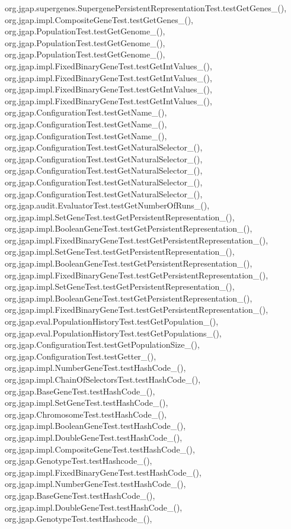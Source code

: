 org.\-jgap.\-supergenes.\-Supergene\-Persistent\-Representation\-Test.\-test\-Get\-Genes\-\_(), org.\-jgap.\-impl.\-Composite\-Gene\-Test.\-test\-Get\-Genes\-\_(), org.\-jgap.\-Population\-Test.\-test\-Get\-Genome\-\_(), org.\-jgap.\-Population\-Test.\-test\-Get\-Genome\-\_(), org.\-jgap.\-Population\-Test.\-test\-Get\-Genome\-\_(), org.\-jgap.\-impl.\-Fixed\-Binary\-Gene\-Test.\-test\-Get\-Int\-Values\-\_(), org.\-jgap.\-impl.\-Fixed\-Binary\-Gene\-Test.\-test\-Get\-Int\-Values\-\_(), org.\-jgap.\-impl.\-Fixed\-Binary\-Gene\-Test.\-test\-Get\-Int\-Values\-\_(), org.\-jgap.\-impl.\-Fixed\-Binary\-Gene\-Test.\-test\-Get\-Int\-Values\-\_(), org.\-jgap.\-Configuration\-Test.\-test\-Get\-Name\-\_(), org.\-jgap.\-Configuration\-Test.\-test\-Get\-Name\-\_(), org.\-jgap.\-Configuration\-Test.\-test\-Get\-Name\-\_(), org.\-jgap.\-Configuration\-Test.\-test\-Get\-Natural\-Selector\-\_(), org.\-jgap.\-Configuration\-Test.\-test\-Get\-Natural\-Selector\-\_(), org.\-jgap.\-Configuration\-Test.\-test\-Get\-Natural\-Selector\-\_(), org.\-jgap.\-Configuration\-Test.\-test\-Get\-Natural\-Selector\-\_(), org.\-jgap.\-Configuration\-Test.\-test\-Get\-Natural\-Selector\-\_(), org.\-jgap.\-audit.\-Evaluator\-Test.\-test\-Get\-Number\-Of\-Runs\-\_(), org.\-jgap.\-impl.\-Set\-Gene\-Test.\-test\-Get\-Persistent\-Representation\-\_(), org.\-jgap.\-impl.\-Boolean\-Gene\-Test.\-test\-Get\-Persistent\-Representation\-\_(), org.\-jgap.\-impl.\-Fixed\-Binary\-Gene\-Test.\-test\-Get\-Persistent\-Representation\-\_(), org.\-jgap.\-impl.\-Set\-Gene\-Test.\-test\-Get\-Persistent\-Representation\-\_(), org.\-jgap.\-impl.\-Boolean\-Gene\-Test.\-test\-Get\-Persistent\-Representation\-\_(), org.\-jgap.\-impl.\-Fixed\-Binary\-Gene\-Test.\-test\-Get\-Persistent\-Representation\-\_(), org.\-jgap.\-impl.\-Set\-Gene\-Test.\-test\-Get\-Persistent\-Representation\-\_(), org.\-jgap.\-impl.\-Boolean\-Gene\-Test.\-test\-Get\-Persistent\-Representation\-\_(), org.\-jgap.\-impl.\-Fixed\-Binary\-Gene\-Test.\-test\-Get\-Persistent\-Representation\-\_(), org.\-jgap.\-eval.\-Population\-History\-Test.\-test\-Get\-Population\-\_(), org.\-jgap.\-eval.\-Population\-History\-Test.\-test\-Get\-Populations\-\_(), org.\-jgap.\-Configuration\-Test.\-test\-Get\-Population\-Size\-\_(), org.\-jgap.\-Configuration\-Test.\-test\-Getter\-\_(), org.\-jgap.\-impl.\-Number\-Gene\-Test.\-test\-Hash\-Code\-\_(), org.\-jgap.\-impl.\-Chain\-Of\-Selectors\-Test.\-test\-Hash\-Code\-\_(), org.\-jgap.\-Base\-Gene\-Test.\-test\-Hash\-Code\-\_(), org.\-jgap.\-impl.\-Set\-Gene\-Test.\-test\-Hash\-Code\-\_(), org.\-jgap.\-Chromosome\-Test.\-test\-Hash\-Code\-\_(), org.\-jgap.\-impl.\-Boolean\-Gene\-Test.\-test\-Hash\-Code\-\_(), org.\-jgap.\-impl.\-Double\-Gene\-Test.\-test\-Hash\-Code\-\_(), org.\-jgap.\-impl.\-Composite\-Gene\-Test.\-test\-Hash\-Code\-\_(), org.\-jgap.\-Genotype\-Test.\-test\-Hashcode\-\_(), org.\-jgap.\-impl.\-Fixed\-Binary\-Gene\-Test.\-test\-Hash\-Code\-\_(), org.\-jgap.\-impl.\-Number\-Gene\-Test.\-test\-Hash\-Code\-\_(), org.\-jgap.\-Base\-Gene\-Test.\-test\-Hash\-Code\-\_(), org.\-jgap.\-impl.\-Double\-Gene\-Test.\-test\-Hash\-Code\-\_(), org.\-jgap.\-Genotype\-Test.\-test\-Hashcode\-\_(), 